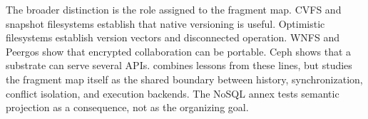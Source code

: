 The broader distinction is the role assigned to the fragment map.  CVFS and
snapshot filesystems establish that native versioning is useful.  Optimistic filesystems
establish version vectors and disconnected operation.  WNFS and Peergos show
that encrypted collaboration can be portable.  Ceph shows that a substrate
can serve several APIs.  \sfs{} combines lessons from these lines, but studies
the fragment map itself as the shared boundary between history,
synchronization, conflict isolation, and execution backends.  The NoSQL annex
tests semantic projection as a consequence, not as the organizing goal.
